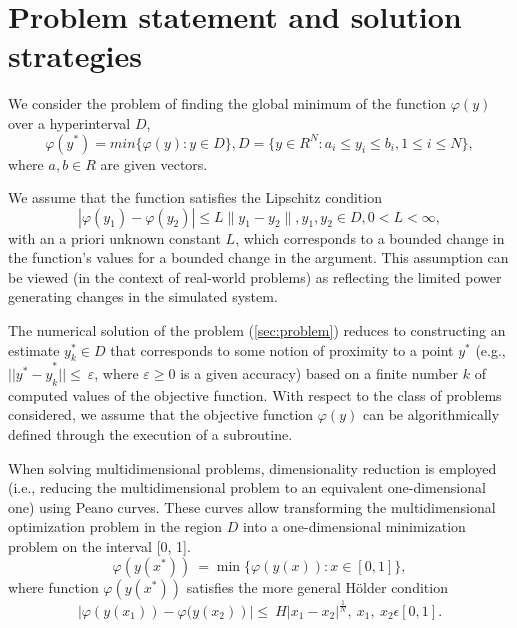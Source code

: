 \documentclass[runningheads]{llncs}
\begin{document}
\section{Problem statement and solution strategies}\label{SecA}

We consider the problem of finding the global minimum of the function $\varphi(y)$ over a hyperinterval $D$, 
\begin{equation} \label{sec:problem}   
	\varphi(y^*) = min\{\varphi(y):y\in D\}, D = \{y \in R^N : a_i \leq y_i \leq b_i, 1 \leq i \leq N \},
\end{equation}
where $a,b \in R$ are given vectors.

We assume that the function satisfies the Lipschitz condition 
\begin{displaymath} 
	|\varphi(y_1)-\varphi(y_2)|\leq L\parallel y_1-y_2 \parallel ,y_1,y_2 \in D, 0<L< \infty, 
\end{displaymath}
with an a priori unknown constant $L$, which corresponds to a bounded change in the function's values for a bounded change in the argument.
This assumption can be viewed (in the context of real-world problems) as reflecting the limited power generating changes in the simulated system.

The numerical solution of the problem (\ref{sec:problem}) reduces to constructing an estimate $y_k^\ast\in D$ that corresponds to some notion of proximity to a point $y^\ast$ (e.g., ${ ||y^\ast-y}_k^\ast||\le\ \varepsilon$, where $\varepsilon\geq0$ is a given accuracy) based on a finite number $k$ of computed values of the objective function. With respect to the class of problems considered, we assume that the objective function $\varphi(y)$ can be algorithmically defined through the execution of a subroutine.

When solving multidimensional problems, dimensionality reduction is employed (i.e., reducing the multidimensional problem to an equivalent one-dimensional one) using Peano curves. These curves allow transforming the multidimensional optimization problem in the region $D$ into a one-dimensional minimization problem on the interval [0, 1].
\begin{displaymath}
	\varphi(y(x^\ast))\ =\min\{\varphi(y(x)): x\in [0,1]\},
\end{displaymath}
where function $\varphi(y(x^\ast))$ satisfies the more general Hölder condition
\begin{displaymath}
	\left|\varphi (y \left(x_1\right))- \varphi (y \left(x_2\right)\right )|\le\ H\left|x_1-x_2\right|^\frac{1}{N},\ x_1,\ x_2\epsilon[0,1].
\end{displaymath} 
\end{document}
